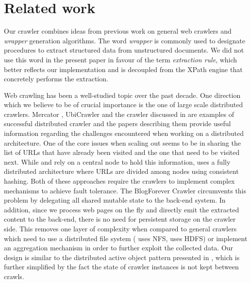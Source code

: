 \section{Related work}
\label{relatedwork}

Our crawler combines ideas from previous work on general web crawlers and \emph{wrapper} generation algorithms. The word \emph{wrapper} is commonly used to designate procedures to extract structured data from unstructured documents. We did not use this word in the present paper in favour of the term \emph{extraction rule}, which better reflects our implementation and is decoupled from the XPath engine that concretely performs the extraction.

Web crawling has been a well-studied topic over the past decade. One direction which we believe to be of crucial importance is the one of large scale distributed crawlers. Mercator \cite{heydon99mercator}, UbiCrawler \cite{boldi2003} and the crawler discussed in \cite{shkapenyuk2002} are examples of successful distributed crawler and the papers describing them provide useful information regarding the challenges encountered when working on a distributed architecture. One of the core issues when scaling out seems to be in sharing the list of URLs that have already been visited and the one that need to be visited next. While \cite{heydon99mercator} and \cite{shkapenyuk2002} rely on a central node to hold this information, \cite{boldi2003} uses a fully distributed architecture where URLs are divided among nodes using consistent hashing. Both of these approaches require the crawlers to implement complex mechanisms to achieve fault tolerance. The BlogForever Crawler circumvents this problem by delegating all shared mutable state to the back-end system. In addition, since we process web pages on the fly and directly emit the extracted content to the back-end, there is no need for persistent storage on the crawler side. This removes one layer of complexity when compared to general crawlers which need to use a distributed file system (\cite{shkapenyuk2002} uses NFS, \cite{berger2011} uses HDFS) or implement an aggregation mechanism in order to further exploit the collected data. Our design is similar to the distributed active object pattern presented in \cite{activeobject1996}, 
which is further simplified by the fact the state of crawler instances is not kept between crawls. 

